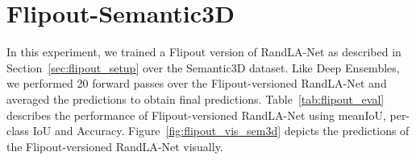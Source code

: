     \section{Flipout-Semantic3D}
    In this experiment, we trained a Flipout version of RandLA-Net as described in Section~\ref{sec:flipout_setup} over the Semantic3D dataset.
    Like Deep Ensembles, we performed 20 forward passes over the Flipout-versioned RandLA-Net and averaged the predictions to obtain final predictions.
    Table~\ref{tab:flipout_eval} describes the performance of Flipout-versioned RandLA-Net using meanIoU, per-class IoU and Accuracy.
    Figure~\ref{fig:flipout_vis_sem3d} depicts the predictions of the Flipout-versioned RandLA-Net visually.
    \begin{table}[h!]
        \caption{Illustration of performance of Flipout-versioned RandLA-Net on Semantic3D dataset. meanIOU, IOU per-class and overall accuracy are represented here.
        C1 to C8 are the classes of Semantic3D which are Manmade terrain, Natural terrain, High vegetation, Low vegetation, Buildings, Hardscapes, Scanning artefacts, and Cars.}
        \label{tab:flipout_eval}
    \end{table}
